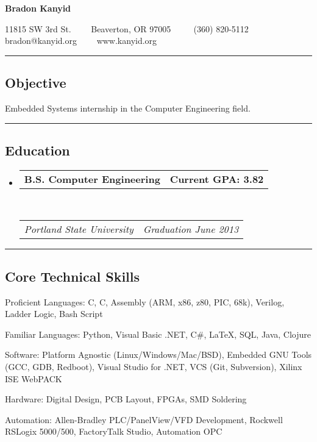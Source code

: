 \documentclass[10pt,letterpaper]{article}
\makeatletter
\newenvironment{indentsection}[1]%
{\begin{list}{}%
	{\setlength{\leftmargin}{#1}}%
	\item[]%
}
{\end{list}}
\newcommand{\headerrow}[2]
{\begin{tabular*}{\linewidth}{l@{\extracolsep{\fill}}r}
	#1 &
	#2 \\
\end{tabular*}}
\newcommand{\CPP}
{C\nolinebreak[4]\hspace{-.05em}\raisebox{.22ex}{\footnotesize\bf ++}}
\makeatother
\begin{document}
\begin{center}
{\LARGE \textbf{Bradon Kanyid}}

11815 SW 3rd St.\ \ \textbullet
\ \ Beaverton, OR 97005 \ \ \textbullet
\ \ (360) 820-5112\\
bradon@kanyid.org\ \ \textbullet
\ \ www.kanyid.org
\end{center}

\hrule
\vspace{-0.4em}
\subsection*{Objective}
\begin{indentsection}{\parindent}
\begin{description*}
	\item Embedded Systems internship in the Computer Engineering field.
\end{description*}
\end{indentsection}
\vspace{1em}

\hrule
\vspace{-0.4em}
\subsection*{Education}

\begin{itemize}
	\parskip=0.1em

	\item 
	\headerrow
                {\textbf{B.S. Computer Engineering}}
		{\textbf{Current GPA: 3.82}}
	\\
	\headerrow
		{\emph{Portland State University}}
		{\emph{Graduation June 2013}}
\end{itemize}
\vspace{1em}


\hrule
\vspace{-0.4em}
\subsection*{Core Technical Skills}

\begin{indentsection}{\parindent}
\begin{description*}
	\item[Proficient Languages:]
    C, \CPP, Assembly (ARM, x86, z80, PIC, 68k), Verilog, Ladder Logic, Bash Script 
	\item[Familiar Languages:]
    Python, Visual Basic .NET, C\#, \LaTeX, SQL, Java, Clojure 
	\item[Software:]
    Platform Agnostic (Linux/Windows/Mac/BSD), Embedded GNU Tools (GCC, GDB, Redboot), Visual Studio for .NET, VCS (Git, Subversion), Xilinx ISE WebPACK
	\item[Hardware:]
    Digital Design, PCB Layout, FPGAs, SMD Soldering 
	\item[Automation:]
    Allen-Bradley PLC/PanelView/VFD Development, Rockwell RSLogix 5000/500, FactoryTalk Studio, Automation OPC 	
\end{description*}
\end{indentsection}
\vspace{1em}
\end{document}
